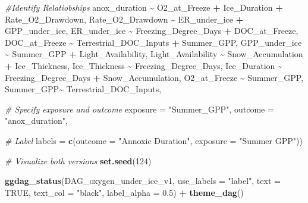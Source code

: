 \documentclass[
]{article}
\newenvironment{Shaded}{\begin{snugshade}}{\end{snugshade}}
\newcommand{\AttributeTok}[1]{\textcolor[rgb]{0.13,0.29,0.53}{#1}}
\newcommand{\CommentTok}[1]{\textcolor[rgb]{0.56,0.35,0.01}{\textit{#1}}}
\newcommand{\ConstantTok}[1]{\textcolor[rgb]{0.56,0.35,0.01}{#1}}
\newcommand{\DecValTok}[1]{\textcolor[rgb]{0.00,0.00,0.81}{#1}}
\newcommand{\FloatTok}[1]{\textcolor[rgb]{0.00,0.00,0.81}{#1}}
\newcommand{\FunctionTok}[1]{\textcolor[rgb]{0.13,0.29,0.53}{\textbf{#1}}}
\newcommand{\NormalTok}[1]{#1}
\newcommand{\SpecialCharTok}[1]{\textcolor[rgb]{0.81,0.36,0.00}{\textbf{#1}}}
\newcommand{\StringTok}[1]{\textcolor[rgb]{0.31,0.60,0.02}{#1}}
\begin{document}
\begin{Shaded}
\begin{Highlighting}[]
      \CommentTok{\#Identify Relatiobships }
\NormalTok{      anox\_duration }\SpecialCharTok{\textasciitilde{}}\NormalTok{ O2\_at\_Freeze }\SpecialCharTok{+}\NormalTok{ Ice\_Duration }\SpecialCharTok{+}\NormalTok{ Rate\_O2\_Drawdown,}
\NormalTok{      Rate\_O2\_Drawdown }\SpecialCharTok{\textasciitilde{}}\NormalTok{ ER\_under\_ice }\SpecialCharTok{+}\NormalTok{ GPP\_under\_ice, }
\NormalTok{      ER\_under\_ice }\SpecialCharTok{\textasciitilde{}}\NormalTok{ Freezing\_Degree\_Days }\SpecialCharTok{+}\NormalTok{ DOC\_at\_Freeze,}
\NormalTok{      DOC\_at\_Freeze }\SpecialCharTok{\textasciitilde{}}\NormalTok{ Terrestrial\_DOC\_Inputs }\SpecialCharTok{+}\NormalTok{ Summer\_GPP, }
\NormalTok{      GPP\_under\_ice }\SpecialCharTok{\textasciitilde{}}\NormalTok{ Summer\_GPP }\SpecialCharTok{+}\NormalTok{ Light\_Availability,}
\NormalTok{      Light\_Availability }\SpecialCharTok{\textasciitilde{}}\NormalTok{ Snow\_Accumulation }\SpecialCharTok{+}\NormalTok{ Ice\_Thickness,}
\NormalTok{      Ice\_Thickness }\SpecialCharTok{\textasciitilde{}}\NormalTok{ Freezing\_Degree\_Days,}
\NormalTok{      Ice\_Duration }\SpecialCharTok{\textasciitilde{}}\NormalTok{ Freezing\_Degree\_Days }\SpecialCharTok{+}\NormalTok{ Snow\_Accumulation, }
\NormalTok{      O2\_at\_Freeze }\SpecialCharTok{\textasciitilde{}}\NormalTok{ Summer\_GPP,}
\NormalTok{      Summer\_GPP}\SpecialCharTok{\textasciitilde{}}\NormalTok{ Terrestrial\_DOC\_Inputs,}
    
      \CommentTok{\# Specify exposure and outcome }
      \AttributeTok{exposure =} \StringTok{"Summer\_GPP"}\NormalTok{, }
      \AttributeTok{outcome =} \StringTok{"anox\_duration"}\NormalTok{,}
      
      \CommentTok{\# Label }
      \AttributeTok{labels =} \FunctionTok{c}\NormalTok{(}\AttributeTok{outcome =} \StringTok{"Annoxic Duration"}\NormalTok{,}
                 \AttributeTok{exposure =} \StringTok{"Summer GPP"}\NormalTok{))}

\CommentTok{\# Visualize both versions }
\FunctionTok{set.seed}\NormalTok{(}\DecValTok{124}\NormalTok{)}

\FunctionTok{ggdag\_status}\NormalTok{(DAG\_oxygen\_under\_ice\_v1,}
             \AttributeTok{use\_labels =} \StringTok{"label"}\NormalTok{,}
             \AttributeTok{text =} \ConstantTok{TRUE}\NormalTok{,}
             \AttributeTok{text\_col =} \StringTok{"black"}\NormalTok{,}
             \AttributeTok{label\_alpha =} \FloatTok{0.5}\NormalTok{) }\SpecialCharTok{+} \FunctionTok{theme\_dag}\NormalTok{()}
\end{Highlighting}
\end{Shaded}
\end{document}

